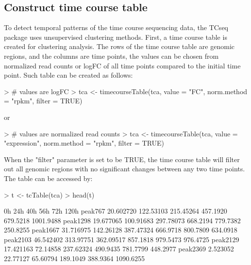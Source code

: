 \documentclass[a4paper]{article}
\begin{document}
\subsection{Construct time course table}
To detect temporal patterns of the time course sequencing data, the TCseq package uses unsupervised clustering methods. First, a time course table is created for clustering analysis. The rows of the time course table are genomic regions, and the columns are time points, the values can be chosen from normalized read counts or logFC of all time points compared to the initial time point. Such table can be created as follows:
\begin{Schunk}
\begin{Sinput}
> # values are logFC
> tca <- timecourseTable(tca, value = "FC", norm.method = "rpkm", filter = TRUE)
\end{Sinput}
\end{Schunk}
or
\begin{Schunk}
\begin{Sinput}
> # values are normalized read counts
> tca <- timecourseTable(tca, value = "expression", norm.method = "rpkm", filter = TRUE)
\end{Sinput}
\end{Schunk}
When the "filter" parameter is set to be TRUE, the time course table will filter out all genomic regions with no significant changes between any two time points. The table can be accessed by:
\begin{Schunk}
\begin{Sinput}
> t <- tcTable(tca)
> head(t)
\end{Sinput}
\begin{Soutput}
                0h       24h       40h      56h      72h      120h
peak767  20.602720 122.53103 215.45264 457.1920 679.5218 1001.9488
peak1298 19.677065 100.91683 297.78073 668.2194 779.7382  250.8255
peak1667 31.716975 142.26128 387.47324 666.9718 800.7809  634.0918
peak2103 46.542402 313.97751 362.09517 857.1818 979.5473  976.4725
peak2129 17.421163  72.14858 237.62324 490.9435 781.7799  448.2977
peak2369  2.523052  22.77127  65.60794 189.1049 388.9364 1090.6255
\end{Soutput}
\end{Schunk}
\end{document}
